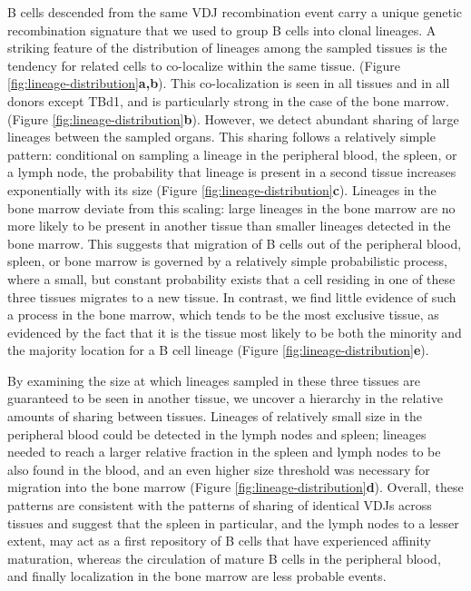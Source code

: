  B cells descended from the same VDJ recombination event carry a unique genetic recombination signature that we used to group B cells into clonal lineages. A striking feature of the distribution of lineages among the sampled tissues is the tendency for related cells to co-localize within the same tissue. (Figure \ref{fig:lineage-distribution}\textbf{a,b}). This co-localization is seen in all tissues and in all donors except TBd1, and is particularly strong in the case of the bone marrow. (Figure \ref{fig:lineage-distribution}\textbf{b}).  However, we detect abundant sharing of large lineages between the sampled organs. This sharing follows a relatively simple pattern: conditional on sampling a lineage in the peripheral blood, the spleen, or a lymph node, the probability that lineage is present in a second tissue increases exponentially with its size (Figure \ref{fig:lineage-distribution}\textbf{c}). Lineages in the bone marrow deviate from this scaling: large lineages in the bone marrow are no more likely to be present in another tissue than smaller lineages detected in the bone marrow. This suggests that migration of B cells out of the peripheral blood, spleen, or bone marrow is governed by a relatively simple probabilistic process, where a small, but constant probability exists that a cell residing in one of these three tissues migrates to a new tissue. In contrast, we find little evidence of such a process in the bone marrow, which tends to be the most exclusive tissue, as evidenced by the fact that it is the tissue most likely to be both the minority and the majority location for a B cell lineage (Figure \ref{fig:lineage-distribution}\textbf{e}).

By examining the size at which lineages sampled in these three tissues are guaranteed to be seen in another tissue, we uncover a hierarchy in the relative amounts of sharing between tissues. Lineages of relatively small size in the peripheral blood could be detected in the lymph nodes and spleen; lineages needed to reach a larger relative fraction in the spleen and lymph nodes to be also found in the blood, and an even higher size threshold was necessary for migration into the bone marrow (Figure \ref{fig:lineage-distribution}\textbf{d}). Overall, these patterns are consistent with the patterns of sharing of identical VDJs across tissues and suggest that the spleen in particular, and the lymph nodes to a lesser extent, may act as a first repository of B cells that have experienced affinity maturation, whereas the circulation of mature B cells in the peripheral blood, and finally localization in the bone marrow are less probable events.

